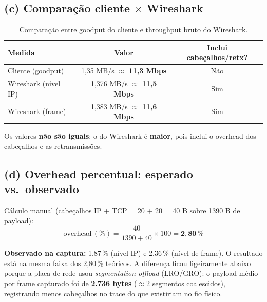 \documentclass[12pt,a4paper]{article}
\begin{document}
\subsection*{(c) Comparação cliente $\times$ Wireshark}

\begin{table}[H]
\centering
\begin{tabular}{@{}lcc@{}}
    \toprule
    \textbf{Medida} & \textbf{Valor} & \textbf{Inclui cabeçalhos/retx?} \\
    \midrule
    Cliente (goodput)    & 1,35 MB/s $\approx$ \textbf{11,3 Mbps} & Não \\
    Wireshark (nível IP) & 1,376 MB/s $\approx$ \textbf{11,5 Mbps} & Sim \\
    Wireshark (frame)    & 1,383 MB/s $\approx$ \textbf{11,6 Mbps} & Sim \\
    \bottomrule
\end{tabular}
\caption{Comparação entre goodput do cliente e throughput bruto do Wireshark.}
\end{table}

Os valores \textbf{não são iguais}: o do Wireshark é \textbf{maior}, pois inclui o
overhead dos cabeçalhos e as retransmissões.

\subsection*{(d) Overhead percentual: esperado vs.\ observado}

Cálculo manual (cabeçalhos IP + TCP = 20 + 20 = 40 B sobre 1390 B de payload):
\begin{equation*}
\text{overhead}\,(\%) = \frac{40}{1390 + 40} \times 100 = \mathbf{2{,}80}\,\%
\end{equation*}

\textbf{Observado na captura:} 1,87\,\% (nível IP) e 2,36\,\% (nível de frame). O resultado
está na mesma faixa dos 2,80\,\% teóricos. A diferença ficou ligeiramente abaixo porque a
placa de rede usou \textit{segmentation offload} (LRO/GRO): o payload médio por frame
capturado foi de \textbf{2.736 bytes} ($\approx$2 segmentos coalescidos), registrando
menos cabeçalhos no trace do que existiriam no fio físico.
\end{document}
